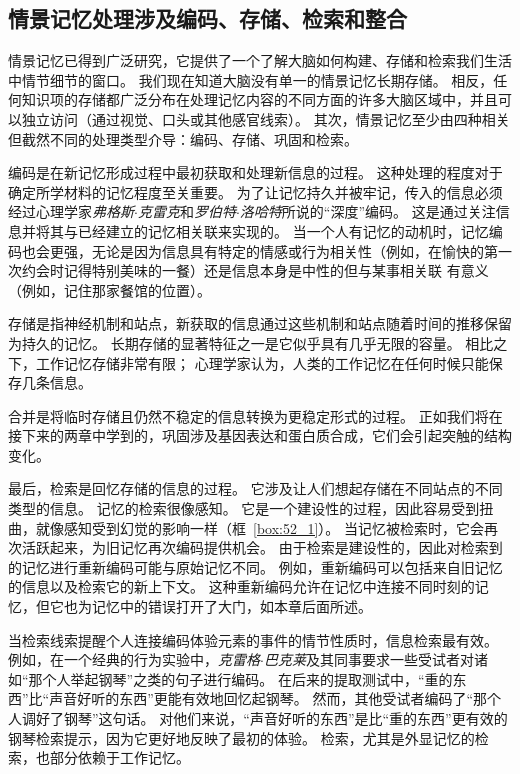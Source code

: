 \subsection{情景记忆处理涉及编码、存储、检索和整合}

情景记忆已得到广泛研究，它提供了一个了解大脑如何构建、存储和检索我们生活中情节细节的窗口。
我们现在知道大脑没有单一的情景记忆长期存储。
相反，任何知识项的存储都广泛分布在处理记忆内容的不同方面的许多大脑区域中，并且可以独立访问（通过视觉、口头或其他感官线索）。
其次，情景记忆至少由四种相关但截然不同的处理类型介导：编码、存储、巩固和检索。


编码是在新记忆形成过程中最初获取和处理新信息的过程。
这种处理的程度对于确定所学材料的记忆程度至关重要。
为了让记忆持久并被牢记，传入的信息必须经过心理学家\textit{弗格斯$\cdot$克雷克}和\textit{罗伯特$\cdot$洛哈特}所说的“深度”编码。
这是通过关注信息并将其与已经建立的记忆相关联来实现的。
当一个人有记忆的动机时，记忆编码也会更强，无论是因为信息具有特定的情感或行为相关性（例如，在愉快的第一次约会时记得特别美味的一餐）还是信息本身是中性的但与某事相关联 有意义（例如，记住那家餐馆的位置）。


存储是指神经机制和站点，新获取的信息通过这些机制和站点随着时间的推移保留为持久的记忆。
长期存储的显著特征之一是它似乎具有几乎无限的容量。
相比之下，工作记忆存储非常有限；
心理学家认为，人类的工作记忆在任何时候只能保存几条信息。


合并是将临时存储且仍然不稳定的信息转换为更稳定形式的过程。
正如我们将在接下来的两章中学到的，巩固涉及基因表达和蛋白质合成，它们会引起突触的结构变化。


最后，检索是回忆存储的信息的过程。
它涉及让人们想起存储在不同站点的不同类型的信息。
记忆的检索很像感知。
它是一个建设性的过程，因此容易受到扭曲，就像感知受到幻觉的影响一样（框~\ref{box:52_1}）。
当记忆被检索时，它会再次活跃起来，为旧记忆再次编码提供机会。
由于检索是建设性的，因此对检索到的记忆进行重新编码可能与原始记忆不同。
例如，重新编码可以包括来自旧记忆的信息以及检索它的新上下文。
这种重新编码允许在记忆中连接不同时刻的记忆，但它也为记忆中的错误打开了大门，如本章后面所述。


当检索线索提醒个人连接编码体验元素的事件的情节性质时，信息检索最有效。
例如，在一个经典的行为实验中，\textit{克雷格$\cdot$巴克莱}及其同事要求一些受试者对诸如“那个人举起钢琴”之类的句子进行编码。
在后来的提取测试中，“重的东西”比“声音好听的东西”更能有效地回忆起钢琴。
然而，其他受试者编码了“那个人调好了钢琴”这句话。
对他们来说，“声音好听的东西”是比“重的东西”更有效的钢琴检索提示，因为它更好地反映了最初的体验。
检索，尤其是外显记忆的检索，也部分依赖于工作记忆。



